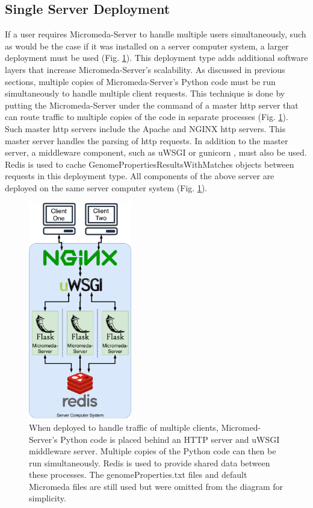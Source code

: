 \subsection{Single Server Deployment} \label{single-server-micromeda-deployment}

If a user requires Micromeda-Server to handle multiple users simultaneously, such as would be the case if it was installed on a server computer system, a larger deployment must be used (Fig. \ref{fig:micromeda-medium-deploy}). This deployment type adds additional software layers that increase Micromeda-Server's scalability. As discussed in previous sections, multiple copies of Micromeda-Server's Python code must be run simultaneously to handle multiple client requests. This technique is done by putting the Micromeda-Server under the command of a master \gls{http} server that can route traffic to multiple copies of the code in separate processes (Fig. \ref{fig:micromeda-medium-deploy}). Such master \gls{http} servers include the Apache \cite{fielding1997apache} and NGINX \cite{reese2008nginx} \gls{http} servers. This master server handles the parsing of \gls{http} requests. In addition to the master server, a middleware component, such as uWSGI \cite{2019uwsgi} or gunicorn \cite{chesneau_2018}, must also be used. Redis is used to cache GenomePropertiesResultsWithMatches objects between requests in this deployment type. All components of the above server are deployed on the same server computer system (Fig. \ref{fig:micromeda-medium-deploy}).

\begin{figure}[!ht]
  \centering
	\includegraphics[width=0.40\textwidth]{media/micromeda-medium-deployment.pdf}
	 \caption{When deployed to handle traffic of multiple clients, Micromed-Server's Python code is placed behind an HTTP server and uWSGI middleware server. Multiple copies of the Python code can then be run simultaneously. Redis is used to provide shared data between these processes. The genomeProperties.txt files and default Micromeda files are still used but were omitted from the diagram for simplicity.}
	 \label{fig:micromeda-medium-deploy}
\end{figure}

